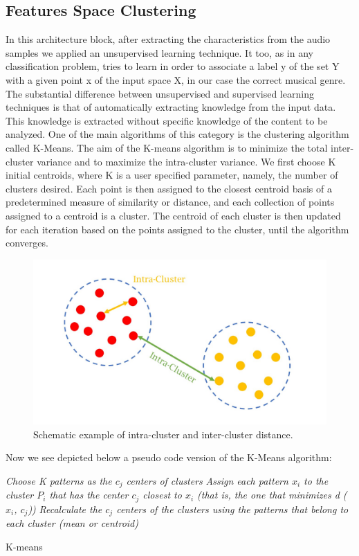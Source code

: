 \documentclass[conference]{IEEEtran}
\begin{document}
\subsection{Features Space Clustering}
\noindent
In this architecture block, after extracting the characteristics from the audio samples we applied an unsupervised learning technique. It too, as in any classification problem, tries to learn in order to associate a label y of the set Y with a given point x of the input space X, in our case the correct musical genre. The substantial difference between unsupervised and supervised learning techniques is that of automatically extracting knowledge from the input data. This knowledge is extracted without specific knowledge of the content to be analyzed. One of the main algorithms of this category is the clustering algorithm called K-Means. The aim of the K-means algorithm is to minimize the total inter-cluster variance and to maximize the intra-cluster variance. We first choose K initial centroids, where K is a user specified parameter, namely, the number of clusters desired. Each point is then assigned to the closest centroid basis of a predetermined measure of similarity or distance, and each collection of points assigned to a centroid is a cluster. The centroid of each cluster is then updated for each iteration based on the points assigned to the cluster, until the algorithm converges.
\begin{figure}[!ht]
    \centering
    \includegraphics[width=0.9\linewidth]{Image/Intra_Inter.jpg}
    \caption{\label{fig:Intra_Inter_Kmeans}Schematic example of intra-cluster and inter-cluster distance.}
\end{figure}
\newline Now we see depicted below a pseudo code version of the K-Means algorithm:
\begin{algorithm}\small
    \SetAlgoLined
    \SetNlSkip{0em}
    \nl{}
    \nl{}
    \nl\emph{Choose K patterns as the $c_j$ centers of clusters}\;
    \nl{}
    {
        \nl\emph{Assign each pattern $x_i$ to the cluster $P_i$ that has the center $c_j$ closest to $x_i$ (that is, the one that minimizes d ($x_i$, $c_j$))}\;
        \nl\emph{Recalculate the $c_j$ centers of the clusters using the patterns that belong to each cluster (mean or centroid)}\;
    }
    \nl\KwRet{}
    \caption{K-means}
\end{algorithm}
\end{document}
